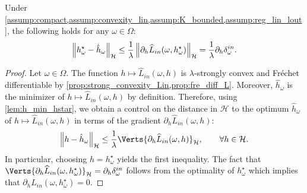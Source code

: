 \begin{proposition}\label{prop:diff_hstar_hhat}
    Under \cref{assump:compact,assump:convexity_lin,assump:K_bounded,assump:reg_lin_lout}, the following holds for any $\omega\in\Omega$:
    \begin{equation*}
        \left\|h^\star_\omega-\hat{h}_\omega\right\|_\mathcal{H}\leq\frac{1}{\lambda}\left\| \partial_h\widehat{L}_{in}(\omega, h^\star_\omega)\right\|_\mathcal{H} = \frac{1}{\lambda}\partial_{h}\delta_\omega^{in}.
    \end{equation*}
\end{proposition}
\begin{proof}
Let $\omega\in\Omega$. 
The function $h\mapsto\widehat{L}_{in}(\omega, h)$ is $\lambda$-strongly convex and Fr\'echet differentiable by  \cref{prop:strong_convexity_Lin,prop:fre_diff_L}. Moreover,  $\hat{h}_{\omega}$ is the minimizer of $h\mapsto\widehat{L}_{in}(\omega, h)$ by definition. 
Therefore, using \cref{lem:h_min_hstar}, we obtain a control on the distance in $\mathcal{H}$ to the optimum $\hat{h}_{\omega}$ of $h\mapsto\widehat{L}_{in}(\omega,h)$ in terms of the gradient $\partial_{h}\widehat{L}_{in}(\omega,h)$:
\begin{align*}
	\left\|h-\hat{h}_\omega\right\|_\mathcal{H}\leq\frac{1}{\lambda}\Verts{\partial_h\widehat{L}_{in}(\omega, h)}_\mathcal{H}, \qquad \forall h\in \mathcal{H}.
\end{align*}
In particular, choosing $h= h^\star_\omega$ yields the first inequality. The fact that $\Verts{\partial_h\widehat{L}_{in}(\omega, h_{\omega}^{\star})}_\mathcal{H}=\Dinh$ follows from the optimality of $h_{\omega}^{\star}$ which implies that  $\partial_h L_{in}(\omega, h_{\omega}^{\star})=0$. 
\end{proof}

